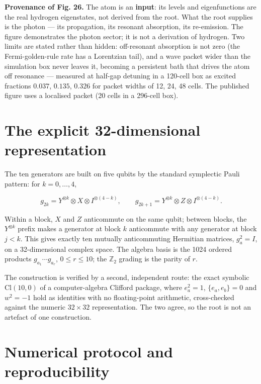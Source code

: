 \documentclass[aps,prd,amsmath,amssymb,superscriptaddress,longbibliography,floatfix,preprint]{revtex4-2}
\begin{document}
\textbf{Provenance of Fig. 26.} The atom is an \textbf{input}: its levels and eigenfunctions are the real hydrogen eigenstates, not derived from the root. What the root supplies is the photon --- its propagation, its resonant absorption, its re-emission. The figure demonstrates the photon sector; it is not a derivation of hydrogen. Two limits are stated rather than hidden: off-resonant absorption is not zero (the Fermi-golden-rule rate has a Lorentzian tail), and a wave packet wider than the simulation box never leaves it, becoming a persistent bath that drives the atom off resonance --- measured at half-gap detuning in a 120-cell box as excited fractions $0.037$, $0.135$, $0.326$ for packet widths of 12, 24, 48 cells. The published figure uses a localised packet (20 cells in a 296-cell box).

\appendix
\section{The explicit 32-dimensional representation}

The ten generators are built on five qubits by the standard symplectic Pauli pattern: for $k = 0,\allowbreak{}\dots,\allowbreak{}4$,

\[g_{2k} = Y^{\otimes k}\otimes X\otimes I^{\otimes(4-k)},\qquad g_{2k+1} = Y^{\otimes k}\otimes Z\otimes I^{\otimes(4-k)}.\]

Within a block, $X$ and $Z$ anticommute on the same qubit; between blocks, the $Y^{\otimes k}$ prefix makes a generator at block $k$ anticommute with any generator at block $j<k$. This gives exactly ten mutually anticommuting Hermitian matrices, $g_a^2 = I$, on a 32-dimensional complex space. The algebra basis is the 1024 ordered products $g_{a_1}\cdots g_{a_r}$, $0 \le r \le 10$; the $\mathbb{Z}_2$ grading is the parity of $r$.

The construction is verified by a second, independent route: the exact symbolic $\mathrm{Cl}(10,\allowbreak{}0)$ of a computer-algebra Clifford package, where $e_a^2 = 1$, $\{e_a,\allowbreak{}e_b\} = 0$ and $w^2 = -1$ hold as identities with no floating-point arithmetic, cross-checked against the numeric $32\times32$ representation. The two agree, so the root is not an artefact of one construction.

\section{Numerical protocol and reproducibility}
\end{document}
